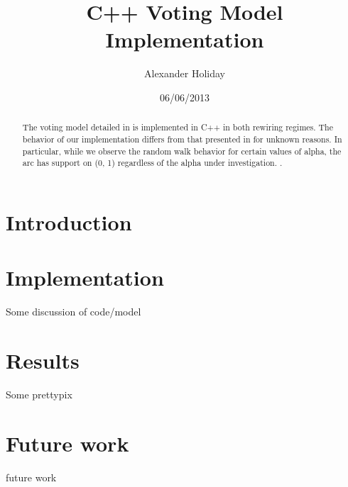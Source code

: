 \documentclass[11pt]{article}
\begin{document}
\title{C++ Voting Model Implementation}
\author{Alexander Holiday}
\date{06/06/2013}
\maketitle
\begin{abstract}
The voting model detailed in \cite{durret:pnas12} is implemented in C++ in both rewiring regimes. The behavior of our implementation differs from that presented in \cite{durret:pnas12} for unknown reasons. In particular, while we observe the random walk behavior for certain values of alpha, the arc has support on (0, 1) regardless of the alpha under investigation. \cite{vazquez:prl08}.
\end{abstract}
\section{Introduction}

\section{Implementation}
Some discussion of code/model
\section{Results}
Some prettypix
\section{Future work}
future work


\end{document}
